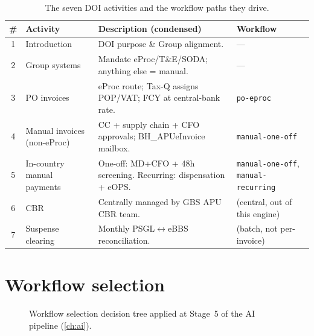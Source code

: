 \documentclass[11pt,a4paper,twoside]{report}
\begin{document}
\begin{table}[htbp]
\centering
\caption{The seven DOI activities and the workflow paths they drive.}
\label{tab:doi-activities}
\small
\begin{tabularx}{\linewidth}{@{}c l X l@{}}
\toprule
\# & \textbf{Activity} & \textbf{Description (condensed)} & \textbf{Workflow} \\ \midrule
1 & Introduction & DOI purpose \& Group alignment. & --- \\
2 & Group systems & Mandate eProc/T\&E/SODA; anything else = manual. & --- \\
3 & PO invoices  & eProc route; Tax-Q assigns POP/VAT; FCY at central-bank rate. & \texttt{po-eproc} \\
4 & Manual invoices (non-eProc) & CC + supply chain + CFO approvals; BH\_APUeInvoice mailbox. & \texttt{manual-one-off} \\
5 & In-country manual payments & One-off: MD+CFO + 48h screening. Recurring: dispensation + eOPS. & \texttt{manual-one-off}, \texttt{manual-recurring} \\
6 & CBR   & Centrally managed by GBS APU CBR team. & (central, out of this engine) \\
7 & Suspense clearing & Monthly PSGL$\leftrightarrow$eBBS reconciliation. & (batch, not per-invoice) \\
\bottomrule
\end{tabularx}
\end{table}

\section{Workflow selection}

\begin{figure}[htbp]
\centering
{}
\caption{Workflow selection decision tree applied at Stage~5 of the AI
pipeline (\cref{ch:ai}).}
\label{fig:workflow-select}
\end{figure}
\end{document}
